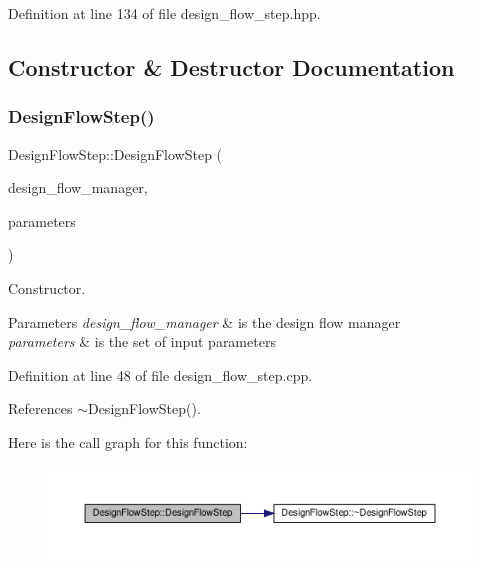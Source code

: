 Definition at line 134 of file design\+\_\+flow\+\_\+step.\+hpp.



\subsection{Constructor \& Destructor Documentation}
\mbox{\label{classDesignFlowStep_a5ae5a1314a6de081e44f0a89ce4d16ab}} 
\subsubsection{\texorpdfstring{Design\+Flow\+Step()}{DesignFlowStep()}}
{\footnotesize\ttfamily Design\+Flow\+Step\+::\+Design\+Flow\+Step (\begin{DoxyParamCaption}\item[{const Design\+Flow\+Manager\+Const\+Ref}]{design\+\_\+flow\+\_\+manager,  }\item[{const \hyperlink{Parameter_8hpp_a37841774a6fcb479b597fdf8955eb4ea}{Parameter\+Const\+Ref}}]{parameters }\end{DoxyParamCaption})}



Constructor. 


\begin{DoxyParams}{Parameters}
{\em design\+\_\+flow\+\_\+manager} & is the design flow manager \\
\hline
{\em parameters} & is the set of input parameters \\
\hline
\end{DoxyParams}


Definition at line 48 of file design\+\_\+flow\+\_\+step.\+cpp.



References $\sim$\+Design\+Flow\+Step().

Here is the call graph for this function\+:
\nopagebreak
\begin{figure}[H]
\begin{center}
\leavevmode
\includegraphics[width=350pt]{d3/da9/classDesignFlowStep_a5ae5a1314a6de081e44f0a89ce4d16ab_cgraph}
\end{center}
\end{figure}
\mbox{\label{classDesignFlowStep_a1145a27e25a0afbe24eed50403ca0e6a}} 
